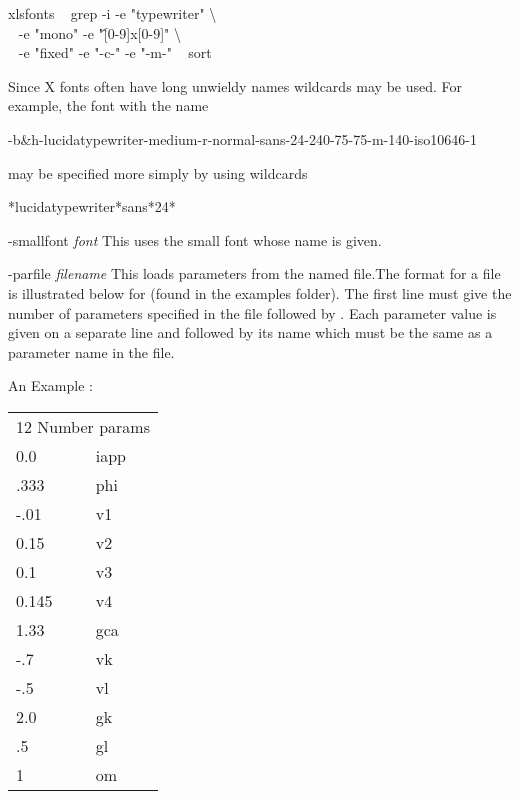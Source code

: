 \begin{description}
\begin{center}
\begin{minipage}{55ex}
              xlsfonts \textbar~ grep -i -e "typewriter" \textbackslash \\
                     $~~$ -e "mono" -e "\^[0-9]x[0-9]" \textbackslash \\
                     $~~$ -e "fixed" -e "-c-" -e "-m-" \textbar~ sort
\end{minipage}\end{center}
Since X fonts often have long unwieldy names wildcards may be used.  For example, the font with the name
\begin{center}\ttfamily
	-b\&h-lucidatypewriter-medium-r-normal-sans-24-240-75-75-m-140-iso10646-1
\end{center}
may be specified more simply by using wildcards
\begin{center}\ttfamily
*lucidatypewriter*sans*24*
\end{center}
\item{-smallfont \emph{font}} This uses the small font whose name is given.
\item{-parfile \emph{filename}} This loads parameters from the named file.The format for a {} file is illustrated below for {} (found in the examples {} folder).  The first line must give the number of parameters specified in the file followed by {}.  Each parameter value is given on a separate line and followed by its name which must be the same as a parameter name in the {} file. 
\begin{center}
\begin{minipage}{55ex}
\begin{center}An Example {}:
\end{center}\ttfamily
\begin{tabular}{ll}
\multicolumn{2}{l}{12 Number params}\\
0.0 & iapp\\
.333 & phi\\
-.01 & v1\\
0.15 & v2\\
0.1 & v3\\
0.145 & v4\\
1.33 & gca\\
-.7 & vk\\
-.5 & vl\\
2.0 & gk\\
.5 & gl\\
1 & om
\end{tabular}
\end{minipage}

\end{center}
\end{description}
